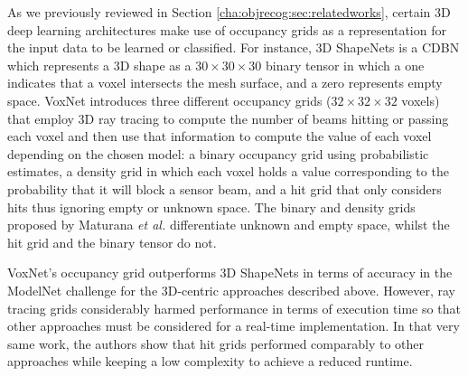 As we previously reviewed in Section \ref{cha:objrecog:sec:relatedworks}, certain 3D deep learning architectures make use of occupancy grids as a representation for the input data to be learned or classified. For instance, 3D ShapeNets \cite{Wu2015} is a \ac{CDBN} which represents a 3D shape as a $30 \times 30 \times 30$ binary tensor in which a one indicates that a voxel intersects the mesh surface, and a zero represents empty space. VoxNet \cite{Maturana2015} introduces three different occupancy grids ($32 \times 32 \times 32$ voxels) that employ 3D ray tracing to compute the number of beams hitting or passing each voxel and then use that information to compute the value of each voxel depending on the chosen model: a binary occupancy grid using probabilistic estimates, a density grid in which each voxel holds a value corresponding to the probability that it will block a sensor beam, and a hit grid that only considers hits thus ignoring empty or unknown space. The binary and density grids proposed by Maturana \emph{et al.} \cite{Maturana2015} differentiate unknown and empty space, whilst the hit grid and the binary tensor do not.

VoxNet’s occupancy grid outperforms 3D ShapeNets in terms of accuracy in the ModelNet challenge for the 3D-centric approaches described above. However, ray tracing grids considerably harmed performance in terms of execution time so that other approaches must be considered for a real-time implementation. In that very same work, the authors show that hit grids performed comparably to other approaches while keeping a low complexity to achieve a reduced runtime.

